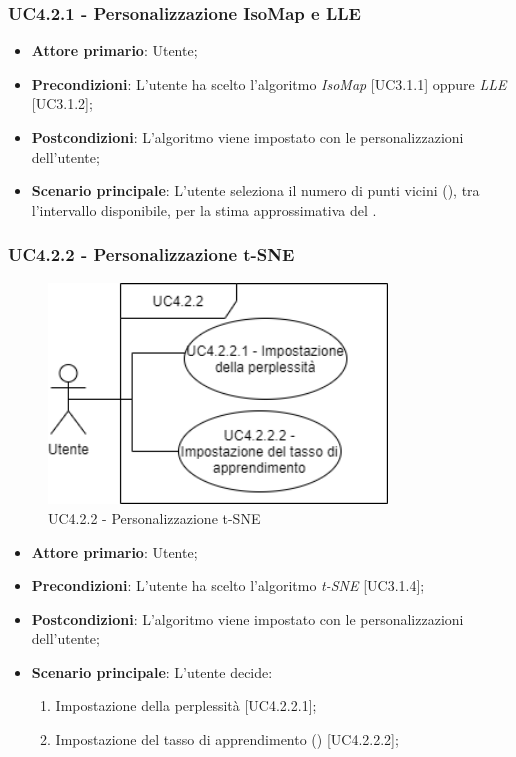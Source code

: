 \subsubsection{UC4.2.1 - Personalizzazione IsoMap e LLE}
\begin{itemize}
	\item \textbf{Attore primario}: Utente;
	
	\item \textbf{Precondizioni}: L'utente ha scelto l'algoritmo \textit{IsoMap} [UC3.1.1] oppure \textit{LLE} [UC3.1.2];
	
	\item \textbf{Postcondizioni}: L'algoritmo viene impostato con le personalizzazioni dell'utente;
	
	\item \textbf{Scenario principale}: L'utente seleziona il numero di punti vicini (), tra l'intervallo disponibile, per la stima approssimativa del .

\end{itemize}

\newpage

\subsubsection{UC4.2.2 - Personalizzazione t-SNE}
\begin{figure}[h]
\includegraphics[width=9cm]{Section/Images/UC4.2.2.png}
\centering
\caption{UC4.2.2 - Personalizzazione t-SNE}
\end{figure}
\begin{itemize}
	\item \textbf{Attore primario}: Utente;
	
	\item \textbf{Precondizioni}: L'utente ha scelto l'algoritmo \textit{t-SNE} [UC3.1.4];
	
	\item \textbf{Postcondizioni}: L'algoritmo viene impostato con le personalizzazioni dell'utente;
	
	\item \textbf{Scenario principale}: L'utente decide:

\begin{enumerate}
\item Impostazione della perplessità [UC4.2.2.1];
\item Impostazione del tasso di apprendimento () [UC4.2.2.2];
\end{enumerate}	

\end{itemize}
	
